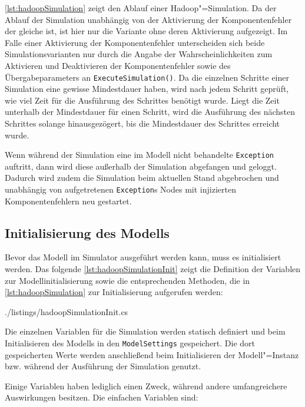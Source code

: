 \autoref{lst:hadoopSimulation} zeigt den Ablauf einer Hadoop"=Simulation.
Da der Ablauf der Simulation unabhängig von der Aktivierung der Komponentenfehler der gleiche ist, ist hier nur die Variante ohne deren Aktivierung aufgezeigt.
Im Falle einer Aktivierung der Komponentenfehler unterscheiden sich beide Simulationsvarianten nur durch die Angabe der Wahrscheinlichkeiten zum Aktivieren und Deaktivieren der Komponentenfehler sowie des Übergabeparameters an \texttt{ExecuteSimulation()}.
Da die einzelnen Schritte einer Simulation eine gewisse Mindestdauer haben, wird nach jedem Schritt geprüft, wie viel Zeit für die Ausführung des Schrittes benötigt wurde.
Liegt die Zeit unterhalb der Mindestdauer für einen Schritt, wird die Ausführung des nächsten Schrittes solange hinausgezögert, bis die Mindestdauer des Schrittes erreicht wurde.

Wenn während der Simulation eine im Modell nicht behandelte \texttt{Exception} auftritt, dann wird diese außerhalb der Simulation abgefangen und geloggt.
Dadurch wird zudem die Simulation beim aktuellen Stand abgebrochen und unabhängig von aufgetretenen \texttt{Exception}s Nodes mit injizierten Komponentenfehlern neu gestartet.

\subsection{Initialisierung des Modells}\label{sec:simulationModelInit}

Bevor das Modell im Simulator ausgeführt werden kann, muss es initialisiert werden.
Das folgende \autoref{lst:hadoopSimulationInit} zeigt die Definition der Variablen zur Modellinitialisierung sowie die entsprechenden Methoden, die in \autoref{lst:hadoopSimulation} zur Initialisierung aufgerufen werden:


{./listings/hadoopSimulationInit.cs}

Die einzelnen Variablen für die Simulation werden statisch definiert und beim Initialisieren des Modells in den \texttt{ModelSettings} gespeichert.
Die dort gespeicherten Werte werden anschließend beim Initialisieren der Modell"=Instanz bzw. während der Ausführung der Simulation genutzt.

Einige Variablen haben lediglich einen Zweck, während andere umfangreichere Auswirkungen besitzen.
Die einfachen Variablen sind:

